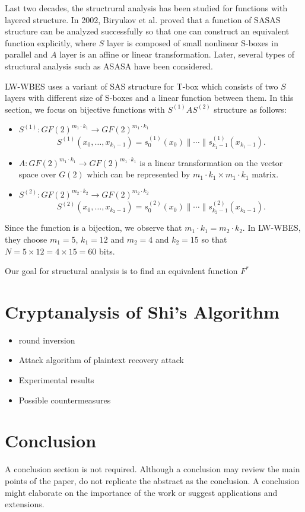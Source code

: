 \documentclass{ieeeaccess}
\begin{document}
Last two decades, 
the structrural analysis has been studied for functions with layered structure.
In 2002, Biryukov et al. proved that a function of SASAS structure
can be analyzed successfully so that one can construct an equivalent function 
explicitly, where $S$ layer is composed of small nonlinear S-boxes in parallel
and $A$ layer is an affine or linear transformation.
Later, several types of structural analysis such as ASASA have been considered.

LW-WBES uses a variant of SAS structure for T-box which
consists of two $S$ layers with different size of S-boxes and a linear function
between them.
In this section, we focus on bijective functions with $S^{(1)}AS^{(2)}$ structure as follows:
\begin{itemize}
\item $S^{(1)}: GF(2)^{m_1 \cdot k_1} \to GF(2)^{m_1 \cdot k_1}$ 
\[
S^{(1)}(x_0, \ldots, x_{k_1-1}) = s^{(1)}_0(x_0) \| \cdots \| s^{(1)}_{k_1-1}(x_{k_1-1}).
\]
\item $A: GF(2)^{m_1 \cdot k_1} \to GF(2)^{m_1 \cdot k_1}$  is a linear transformation
on the vector space over $G(2)$ which can be represented by
$m_1\cdot k_1 \times m_1\cdot k_1$ matrix.
\item $S^{(2)}: GF(2)^{m_2 \cdot k_2} \to GF(2)^{m_2 \cdot k_2}$ 
\[
S^{(2)}(x_0, \ldots, x_{k_2-1}) = s^{(2)}_0(x_0) \| \cdots \| s^{(2)}_{k_2-1}(x_{k_2-1}).
\]
\end{itemize}
Since the function is a bijection, we observe that
$m_1\cdot k_1 = m_2\cdot k_2$. 
In LW-WBES, they choose $m_1 = 5$, $k_1 =12$ and
$m_2=4$ and $k_2 = 15$ so that $N=5\times 12 =4\times 15= 60$ bits.

Our goal for structural analysis is to find an equivalent function $F^*$


\section{Cryptanalysis of Shi's Algorithm}

\begin{itemize}
\item round inversion
\item Attack algorithm of plaintext recovery attack
\item Experimental results
\item Possible countermeasures
\end{itemize}


\section{Conclusion}
A conclusion section is not required. Although a conclusion may review the 
main points of the paper, do not replicate the abstract as the conclusion. A 
conclusion might elaborate on the importance of the work or suggest 
applications and extensions. 
\end{document}
